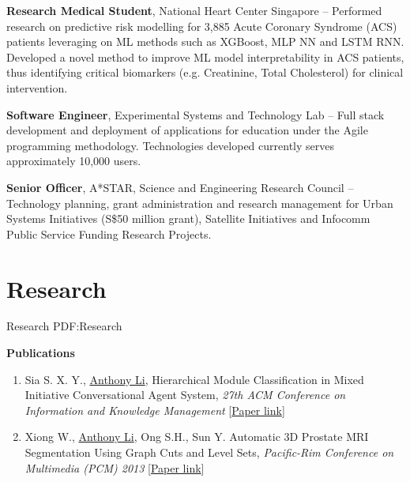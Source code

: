 \documentclass[letterpaper,10pt,oneside]{article}
\begin{document}
\begin{body}
{\textbf{Research Medical Student}, National Heart Center Singapore}
\hfill
{} --  
\BulletItem 
Performed research on predictive risk modelling for 3,885 Acute Coronary Syndrome (ACS) patients leveraging on ML methods such as XGBoost, MLP NN and LSTM RNN.
\BulletItem
Developed a novel method to improve ML model interpretability in ACS patients, thus identifying critical biomarkers (e.g. Creatinine, Total Cholesterol) for clinical intervention.

{\textbf{Software Engineer}, Experimental Systems and Technology Lab}
\hfill
{} --
\BulletItem
Full stack development and deployment of applications for education under the Agile programming methodology. Technologies developed currently serves approximately 10,000 users.

{\textbf{Senior Officer}, A*STAR, Science and Engineering Research Council}
\hfill
{} --
\BulletItem
Technology planning, grant administration and research management for Urban Systems Initiatives (S\$50 million grant), Satellite Initiatives and Infocomm Public Service Funding Research Projects.

\section
{Research}
{Research}
{PDF:Research}

\textbf{Publications}
\GapNoBreak
{}

\begin{enumerate}
\item Sia S. X. Y., \underline{Anthony Li}, \textcolor{mygray}{Hierarchical Module Classification in Mixed Initiative Conversational Agent System}, \textit{27th ACM Conference on Information and Knowledge Management}
[\href{https://dl.acm.org/citation.cfm?id=3133185}{Paper link}]
\item Xiong W., \underline{Anthony Li}, Ong S.H., Sun Y. \textcolor{mygray}{Automatic 3D Prostate MRI Segmentation Using Graph Cuts and Level Sets}, \textit{Pacific-Rim Conference on Multimedia (PCM) 2013}
[\href{https://link.springer.com/chapter/10.1007\%2F978-3-319-03731-8_20}{Paper link}]
\end{enumerate}

%



\end{body}
\end{document}

